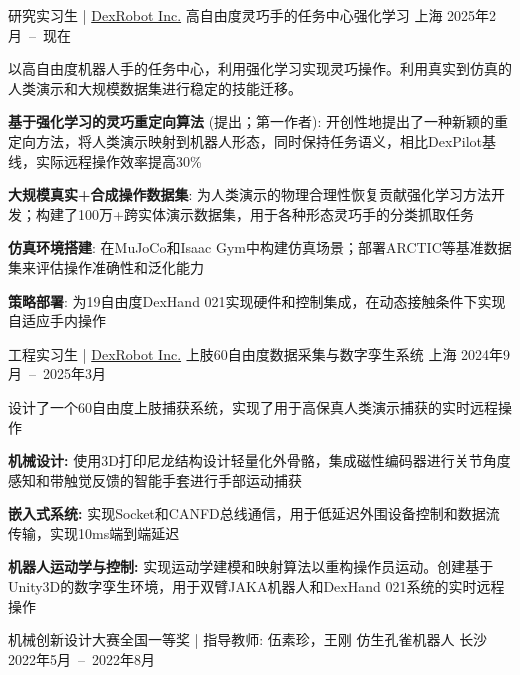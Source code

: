 
\vspace{-8mm}

\begin{cventries}

    \cventry
      {研究实习生 | \href{https://dex-robot.com}{DexRobot Inc.}} %
      {高自由度灵巧手的任务中心强化学习} %
      {上海} %
      {2025年2月~--~现在} %
      {
        以高自由度机器人手的任务中心，利用强化学习实现灵巧操作。利用真实到仿真的人类演示和大规模数据集进行稳定的技能迁移。
        \begin{cvitems}
          \item{\textbf{基于强化学习的灵巧重定向算法} (提出；第一作者): 开创性地提出了一种新颖的重定向方法，将人类演示映射到机器人形态，同时保持任务语义，相比DexPilot基线，实际远程操作效率提高30\%}
          \item{\textbf{大规模真实+合成操作数据集}: 为人类演示的物理合理性恢复贡献强化学习方法开发；构建了100万+跨实体演示数据集，用于各种形态灵巧手的分类抓取任务}
          \item{\textbf{仿真环境搭建}: 在MuJoCo和Isaac Gym中构建仿真场景；部署ARCTIC等基准数据集来评估操作准确性和泛化能力}
          \item{\textbf{策略部署}: 为19自由度DexHand 021实现硬件和控制集成，在动态接触条件下实现自适应手内操作}
        \end{cvitems}
      }
  \cventry
    {工程实习生 | \href{https://dex-robot.com}{DexRobot Inc.}} %
    {上肢60自由度数据采集与数字孪生系统} %
    {上海} %
    {2024年9月~--~2025年3月} %
    {
      设计了一个60自由度上肢捕获系统，实现了用于高保真人类演示捕获的实时远程操作
      \begin{cvitems}
        \item{\textbf{机械设计:} 使用3D打印尼龙结构设计轻量化外骨骼，集成磁性编码器进行关节角度感知和带触觉反馈的智能手套进行手部运动捕获}
        \item{\textbf{嵌入式系统:} 实现Socket和CANFD总线通信，用于低延迟外围设备控制和数据流传输，实现10ms端到端延迟}
        \item{\textbf{机器人运动学与控制:} 实现运动学建模和映射算法以重构操作员运动。创建基于Unity3D的数字孪生环境，用于双臂JAKA机器人和DexHand 021系统的实时远程操作}
      \end{cvitems}
    }
    \cventry
      {机械创新设计大赛全国一等奖 | 指导教师: 伍素珍，王刚} %
      {仿生孔雀机器人} %
      {长沙} %
      {2022年5月~--~2022年8月} %

\end{cventries}

